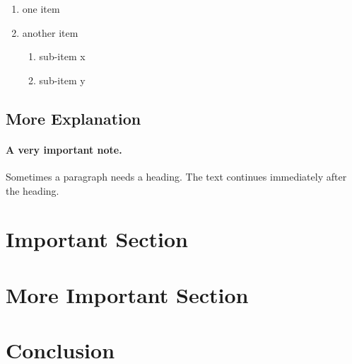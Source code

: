 \documentclass[10pt,twocolumn,twoside,a4paper]{report} %
\begin{document}
\begin{enumerate}
\item one item
\item another item
	\begin{enumerate}
	\item sub-item x
	\item sub-item y
	\end{enumerate}
\end{enumerate}

\subsection{More Explanation} \label{another:more_explanation}

\paragraph{A very important note.}
Sometimes a paragraph needs a heading. The text continues immediately after the heading.

\section{Important Section} \label{important_section}

\section{More Important Section} \label{more_important_section}

\section{Conclusion} \label{conclusion} %



\end{document}
